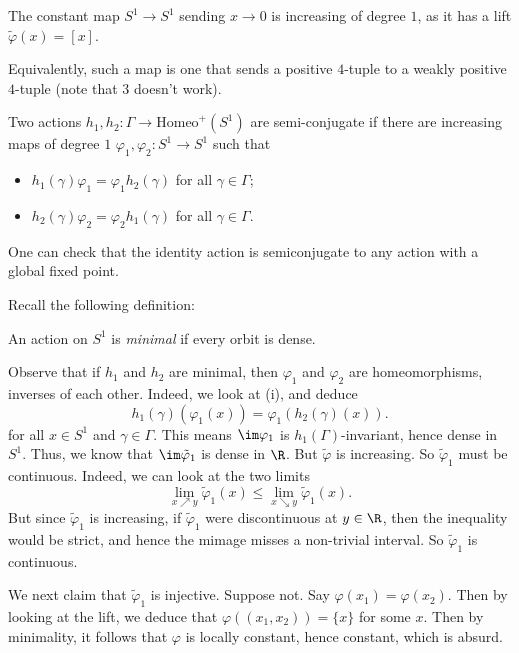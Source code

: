\documentclass[a4paper]{article}
\newcommand\Homeo{\mathrm{Homeo}}
\begin{document}
\begin{eg}
  The constant map $S^1 \to S^1$ sending $x \to 0$ is increasing of degree $1$, as it has a lift $\tilde{\varphi}(x) = [x]$.
\end{eg}

Equivalently, such a map is one that sends a positive $4$-tuple to a weakly positive $4$-tuple (note that $3$ doesn't work). %

\begin{defi}
  Two actions $h_1, h_2: \Gamma \to \Homeo^+(S^1)$ are semi-conjugate if there are increasing maps of degree $1$ $\varphi_1, \varphi_2: S^1 \to S^1$ such that
  \begin{itemize}
    \item $h_1(\gamma) \varphi_1 = \varphi_1 h_2(\gamma)$ for all $\gamma \in \Gamma$;
    \item $h_2(\gamma) \varphi_2 = \varphi_2 h_1(\gamma)$ for all $\gamma \in \Gamma$.
  \end{itemize}
\end{defi}
One can check that the identity action is semiconjugate to any action with a global fixed point.

Recall the following definition:
\begin{defi}
  An action on $S^1$ is \emph{minimal} if every orbit is dense.
\end{defi}
Observe that if $h_1$ and $h_2$ are minimal, then $\varphi_1$ and $\varphi_2$ are homeomorphisms, inverses of each other. Indeed, we look at (i), and deduce
\[
  h_1(\gamma) (\varphi_1(x)) = \varphi_1(h_2(\gamma)(x)).
\]
for all $x \in S^1$ and $\gamma \in \Gamma$. This means $\im \varphi_1$ is $h_1(\Gamma)$-invariant, hence dense in $S^1$. Thus, we know that $\im \tilde{\varphi}_1$ is dense in $\R$. But $\tilde{\varphi}$ is increasing. So $\tilde{\varphi}_1$ must be continuous. Indeed, we can look at the two limits
\[
  \lim_{x \nearrow y} \tilde{\varphi}_1(x) \leq \lim_{x \searrow y} \tilde{\varphi}_1(x).
\]
But since $\tilde{\varphi}_1$ is increasing, if $\tilde{\varphi}_1$ were discontinuous at $y \in \R$, then the inequality would be strict, and hence the mimage misses a non-trivial interval. So $\tilde{\varphi}_1$ is continuous.

We next claim that $\tilde{\varphi}_1$ is injective. Suppose not. Say $\varphi(x_1) = \varphi(x_2)$. Then by looking at the lift, we deduce that $\varphi((x_1, x_2)) = \{x\}$ for some $x$. Then by minimality, it follows that $\varphi$ is locally constant, hence constant, which is absurd.
\end{document}
